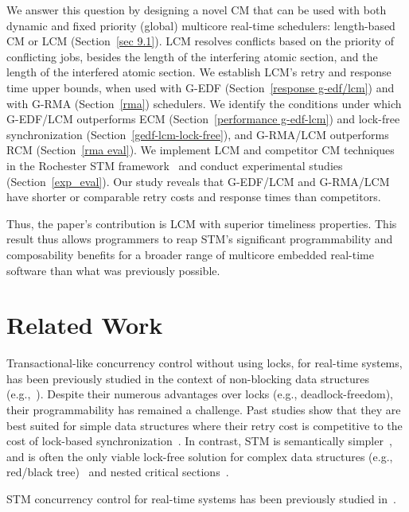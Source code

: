 \documentclass{sig-alternate}
\begin{document}
We answer this question by designing a novel CM that can be used with both dynamic and fixed priority (global) multicore real-time schedulers: length-based CM or LCM (Section~\ref{sec 9.1}). LCM resolves conflicts based on the priority of conflicting jobs, besides the length of the interfering atomic section, and the length of the interfered atomic section.  We establish LCM's retry and response time upper bounds, when used with G-EDF (Section~\ref{response g-edf/lcm}) and with G-RMA (Section~\ref{rma}) schedulers. We identify the conditions under which G-EDF/LCM outperforms ECM (Section~\ref{performance g-edf-lcm}) and lock-free synchronization (Section~\ref{gedf-lcm-lock-free}), and G-RMA/LCM outperforms RCM (Section~\ref{rma eval}). 
We implement LCM and competitor CM techniques in the Rochester STM framework~\cite{marathe2006lowering} and conduct experimental studies (Section~\ref{exp_eval}). Our study reveals that G-EDF/LCM and G-RMA/LCM have shorter or comparable retry costs and response times than competitors. 

Thus, the paper's contribution is LCM with superior timeliness properties. This result thus allows programmers to reap STM's significant programmability and composability benefits for a broader range of multicore embedded real-time software than what was previously possible.


\section{Related Work}
\label{sec:past}

Transactional-like concurrency control without using locks, for real-time systems, has been previously studied in the context of non-blocking data structures (e.g.,~\cite{anderson95realtime}). Despite their numerous advantages over locks 
(e.g., deadlock-freedom), 
their programmability has remained a challenge. 
Past studies show that they are best suited for simple data structures where their retry cost is competitive to the cost of lock-based synchronization~\cite{bc+08}.  In contrast, STM is semantically simpler~\cite{Herlihy:2006:AMP:1146381.1146382}, and is often the only viable lock-free solution for complex data structures (e.g., red/black tree)~\cite{key-1} and nested critical sections~\cite{Saha:2006:MHP:1122971.1123001}.

STM concurrency control for real-time systems has been previously studied in~\cite{manson2006preemptible,fahmy2009bounding,sarni2009real,schoeberl2010rttm,key-1,barrosmanaging,stmconcurrencycontrol:emsoft11}.
\end{document}
